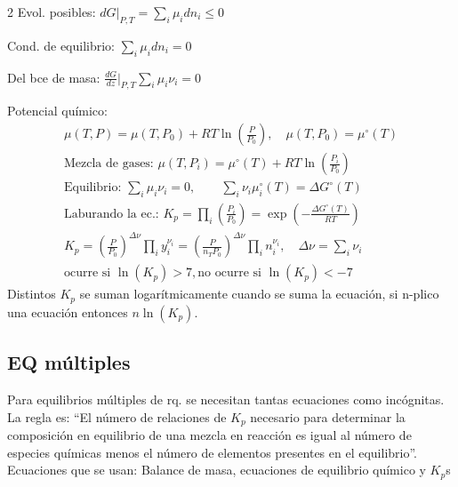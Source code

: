 \documentclass[9pt]{article}
\begin{document}
\begin{multicols}{2}
Evol. posibles: $\displaystyle dG \rvert_{P,T}= \sum_{i} \mu_i dn_i \leq 0$

Cond. de equilibrio: $\displaystyle \sum_{i}\mu_i dn_i = 0$

Del bce de masa: $\displaystyle \frac{dG}{dz}\biggr\rvert_{P,T}\sum_{i}\mu_i \nu_i = 0$

Potencial químico:
\begin{gather*}
  \mu(T,P) = \mu(T,P_0) + RT \ln(\frac{P}{P_0}), \quad \mu(T,P_0) = \mu^\circ(T)\\
  \text{Mezcla de gases: } \mu(T,P_i) = \mu^\circ(T) + RT \ln(\frac{P_i}{P_0})  \\
  \text{Equilibrio: } \sum_{i} \mu_i \nu_i = 0, \qquad
  \sum_i \nu_i \mu_i ^\circ (T) = \Delta G ^\circ (T)\\
  \text{Laburando la ec.: } K_p = \prod_i \left(\frac{P_i}{P_0}\right) = \exp(-\frac{\Delta G^\circ(T)}{RT})\\
  K_p = \left(\frac{P}{P_0}\right)^{\Delta\nu} \prod_i y_i^{\nu_i} =
  \left(\frac{P}{n_T P_0}\right)^{\Delta\nu} \prod_i n_i^{\nu_i}, \quad \Delta\nu = \sum_{i} \nu_i\\
  \text{ocurre si } \ln(K_p)>7 , \text{no ocurre si } \ln(K_p)<-7
\end{gather*}
Distintos $K_p$ se suman logarítmicamente cuando se suma la ecuación, si n-plico una ecuación entonces $n\ln(K_p)$.
\subsection{EQ múltiples}

Para equilibrios múltiples de rq. se necesitan tantas ecuaciones como incógnitas. La regla es: ``El número de relaciones de $K_p$ necesario para determinar la composición en equilibrio de una mezcla en reacción es igual al número de especies químicas menos el número de elementos presentes en el equilibrio''.
Ecuaciones que se usan: Balance de masa, ecuaciones de equilibrio químico y $K_p$s 








\clearpage



\end{multicols}
\end{document}
